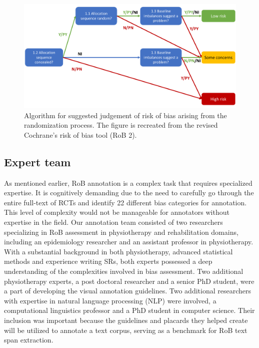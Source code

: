 \documentclass[sn-mathphys,Numbered]{sn-jnl}%
\theoremstyle{thmstyleone}%
\theoremstyle{thmstyletwo}%
\theoremstyle{thmstylethree}%
\begin{document}
%
%
%
\begin{figure}
    \centering
    \includegraphics[width=0.80\columnwidth]{figures/flowchart.pdf}
    \caption{Algorithm for suggested judgement of risk of bias arising from the randomization process. The figure is recreated from the revised Cochrane's risk of bias tool (RoB 2).~\cite{sterne2019rob}}
    \label{fig:flowchart}
\end{figure}
%
%
%

%
%
%
\subsection{Expert team}
\label{experts}
%
As mentioned earlier, RoB annotation is a complex task that requires specialized expertise.
It is cognitively demanding due to the need to carefully go through the entire full-text of RCTs and identify 22 different bias categories for annotation.
This level of complexity would not be manageable for annotators without expertise in the field.
Our annotation team consisted of two researchers specializing in RoB assessment in physiotherapy and rehabilitation domains, including an epidemiology researcher and an assistant professor in physiotherapy.
With a substantial background in both physiotherapy, advanced statistical methods and experience writing SRs, both experts possessed a deep understanding of the complexities involved in bias assessment.
Two additional physiotherapy experts, a post doctoral researcher and a senior PhD student, were a part of developing the visual annotation guidelines.
Two additional researchers with expertise in natural language processing (NLP) were involved, a computational linguistics professor and a PhD student in computer science.
Their inclusion was important because the guidelines and placards they helped create will be utilized to annotate a text corpus, serving as a benchmark for RoB text span extraction.
%
%
%
\end{document}
